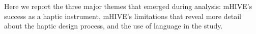 



%
%
Here we report the three major themes that emerged during analysis: %
%
 mHIVE's success as a haptic instrument, mHIVE's limitations that reveal more detail about the haptic design process, and the use of language in the study.

